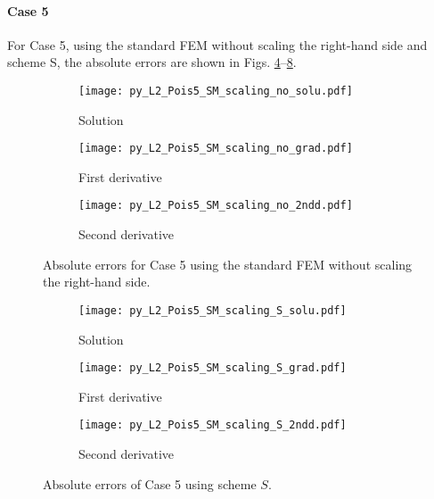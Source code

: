 \documentclass[review,3p]{elsarticle}
\begin{document}
\newpage
\paragraph{Case 5}
For Case 5, using the standard FEM without scaling the right-hand side and scheme S, the absolute errors are shown in Figs. \ref{py_L2_Pois5_SM_scaling_no}--\ref{py_L2_Pois5_SM_scaling_S}.

\begin{figure}[!ht]
    \begin{subfigure}{5.5cm}
        \texttt{[image: py\_L2\_Pois5\_SM\_scaling\_no\_solu.pdf]}
        \caption{Solution}
        \label{py_L2_Pois5_SM_scaling_no_solu}
    \end{subfigure}
    \hspace{-0.2cm}
    \begin{subfigure}{5.5cm}
        \texttt{[image: py\_L2\_Pois5\_SM\_scaling\_no\_grad.pdf]}
        \caption{First derivative}
        \label{py_L2_Pois5_SM_scaling_no_grad}
    \end{subfigure}
    \hspace{-0.2cm}
    \begin{subfigure}{5.5cm}
        \texttt{[image: py\_L2\_Pois5\_SM\_scaling\_no\_2ndd.pdf]}
        \caption{Second derivative}
        \label{py_L2_Pois5_SM_scaling_no_2ndd}
    \end{subfigure}
\caption{Absolute errors for Case 5 using the standard FEM without scaling the right-hand side.}
\label{py_L2_Pois5_SM_scaling_no}
\end{figure}

\begin{figure}[!ht]
    \begin{subfigure}{5.5cm}
        \texttt{[image: py\_L2\_Pois5\_SM\_scaling\_S\_solu.pdf]}
        \caption{Solution}
        \label{py_L2_Pois5_SM_scaling_S_solu}
    \end{subfigure}
    \hspace{-0.2cm}
    \begin{subfigure}{5.5cm}
        \texttt{[image: py\_L2\_Pois5\_SM\_scaling\_S\_grad.pdf]}
        \caption{First derivative}
        \label{py_L2_Pois5_SM_scaling_S_grad}
    \end{subfigure}
    \hspace{-0.2cm}
    \begin{subfigure}{5.5cm}
        \texttt{[image: py\_L2\_Pois5\_SM\_scaling\_S\_2ndd.pdf]}
        \caption{Second derivative}
        \label{py_L2_Pois5_SM_scaling_S_2ndd}
    \end{subfigure}
\caption{Absolute errors of Case 5 using scheme $S$.}
\label{py_L2_Pois5_SM_scaling_S}
\end{figure}
\end{document}
